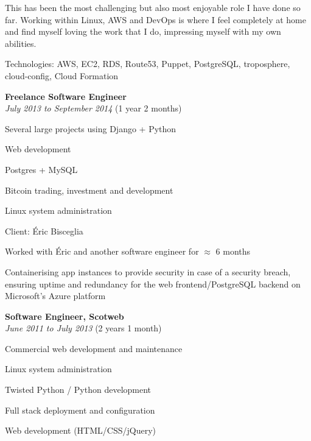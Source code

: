 \documentclass[12pt]{article}
\newenvironment{outerlist}[1][\enskip\textbullet]%
        {\begin{itemize}[#1]}{\end{itemize}%
         \vspace{-.6\baselineskip}}
\newenvironment{innerlist}[1][\enskip\textbullet]%
        {\begin{compactitem}[#1]}{\end{compactitem}}
\newcommand{\halfblankline}{\quad\vspace{-0.5\baselineskip}\pagebreak[3]}
\begin{document}
\begin{outerlist}
\begin{innerlist}
		\item This has been the most challenging but also most enjoyable role I have done so far. Working within Linux, AWS and DevOps is where I feel completely at home and find myself loving the work that I do, impressing myself with my own abilities.
		\item Technologies: AWS, EC2, RDS, Route53, Puppet, PostgreSQL, troposphere, cloud-config, Cloud Formation
	\end{innerlist}
\end{outerlist}

\halfblankline

\vspace{-2mm}
\begin{outerlist}
	\item[] \textbf{Freelance Software Engineer} \\
	\textit{July 2013 to September 2014} (1 year 2 months)
	\begin{innerlist}
		\item Several large projects using Django + Python
		\item Web development
		\item Postgres + MySQL
		\item Bitcoin trading, investment and development
		\item Linux system administration
	\end{innerlist}
	\item[] Client: Éric Bisceglia
	\begin{innerlist}
		\item Worked with Éric and another software engineer for $\approx$ 6 months
		\item Containerising app instances to provide security in case of a security breach, ensuring uptime and redundancy for the web frontend/PostgreSQL backend on Microsoft's Azure platform
	\end{innerlist}
\end{outerlist}

\halfblankline

\vspace{-2mm}
\begin{outerlist}
\item[] \textbf{Software Engineer, Scotweb} \\
        \textit{June 2011 to July 2013} (2 years 1 month)
	\begin{innerlist}
		\item Commercial web development and maintenance
		\item Linux system administration
		\item Twisted Python / Python development
		\item Full stack deployment and configuration
		\item Web development (HTML/CSS/jQuery)
	\end{innerlist}
\end{outerlist}
\end{document}
